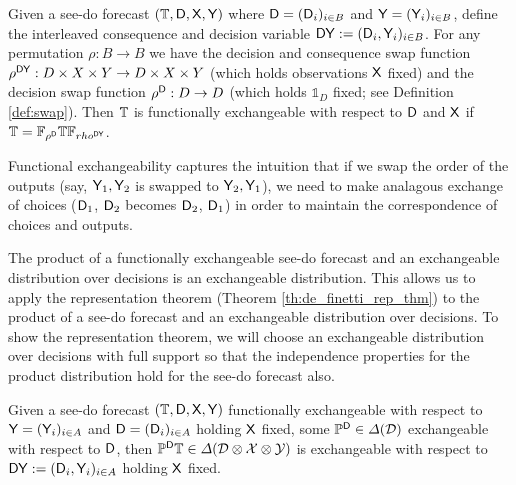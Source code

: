 \begin{definition}
Given a see-do forecast $(\mathbb{T},\mathsf{D},\mathsf{X},\mathsf{Y})$ where $\mathsf{D}=(\mathsf{D}_i)_{i\in B}$ and $\mathsf{Y}=(\mathsf{Y}_i)_{i\in B}$, define the interleaved consequence and decision variable $\mathsf{DY}:=(\mathsf{D}_i,\mathsf{Y}_i)_{i\in B}$. For any permutation $\rho:B\to B$ we have the decision and consequence swap function $\rho^{\mathsf{DY}}:D\times X\times Y\to D\times X\times Y$ (which holds observations $\mathsf{X}$ fixed) and the decision swap function $\rho^{\mathsf{D}}:D\to D$ (which holds $\mathds{1}_D$ fixed; see Definition \ref{def:swap}). Then $\mathbb{T}$ is functionally exchangeable with respect to $\mathsf{D}$ and $\mathsf{X}$ if $\mathbb{T}=\mathbb{F}_{\rho^{\mathsf{D}}}\mathbb{T}\mathbb{F}_{rho^{\mathsf{D}\mathsf{Y}}}$.
\end{definition}

Functional exchangeability captures the intuition that if we swap the order of the outputs (say, $\mathsf{Y}_1,\mathsf{Y}_2$ is swapped to $\mathsf{Y}_2, \mathsf{Y}_1$), we need to make analagous exchange of choices ($\mathsf{D}_1$, $\mathsf{D}_2$ becomes $\mathsf{D}_2$, $\mathsf{D}_1$) in order to maintain the correspondence of choices and outputs.

The product of a functionally exchangeable see-do forecast and an exchangeable distribution over decisions is an exchangeable distribution. This allows us to apply the representation theorem (Theorem \ref{th:de_finetti_rep_thm}) to the product of a see-do forecast and an exchangeable distribution over decisions. To show the representation theorem, we will choose an exchangeable distribution over decisions with full support so that the independence properties for the product distribution hold for the see-do forecast also. 

\begin{lemma}\label{lem:f-ex2ex}
Given a see-do forecast $(\mathbb{T},\mathsf{D},\mathsf{X},\mathsf{Y})$ functionally exchangeable with respect to $\mathsf{Y}=(\mathsf{Y}_i)_{i\in A}$ and $\mathsf{D}=(\mathsf{D}_i)_{i\in A}$ holding $\mathsf{X}$ fixed, some $\mathbb{P}^{\mathsf{D}}\in \Delta(\mathcal{D})$ exchangeable with respect to $\mathsf{D}$, then $\mathbb{P}^{\mathsf{D}}\mathbb{T}\in \Delta(\mathcal{D}\otimes\mathcal{X}\otimes\mathcal{Y})$ is exchangeable with respect to $\mathsf{DY}:=(\mathsf{D}_i,\mathsf{Y}_i)_{i\in A}$ holding $\mathsf{X}$ fixed.
\end{lemma}

